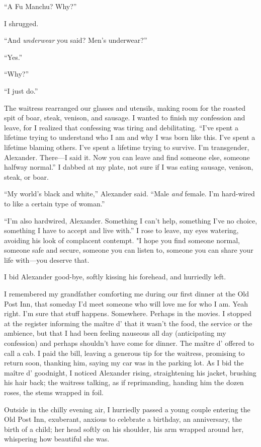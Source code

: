 ``A Fu Manchu? Why?''

I shrugged.

``And \emph{underwear} you said? Men's underwear?''

``Yes.''

``Why?''

``I just do.''

The waitress rearranged our glasses and utensils, making room for the
roasted spit of boar, steak, venison, and sausage. I wanted to finish my
confession and leave, for I realized that confessing was tiring and
debilitating. ``I've spent a lifetime trying to understand who I am and
why I was born like this. I've spent a lifetime blaming others. I've
spent a lifetime trying to survive. I'm transgender, Alexander.
There---I said it. Now you can leave and find someone else, someone
halfway normal.'' I dabbed at my plate, not sure if I was eating
sausage, venison, steak, or boar.

``My world's black and white,'' Alexander said. ``Male \emph{and}
female. I'm hard-wired to like a certain type of woman.''

``I'm also hardwired, Alexander. Something I can't help, something I've
no choice, something I have to accept and live with.'' I rose to leave,
my eyes watering, avoiding his look of complacent contempt. "I hope you
find someone normal, someone safe and secure, someone you can listen to,
someone you can share your life with---you deserve that.

I bid Alexander good-bye, softly kissing his forehead, and hurriedly
left.

I remembered my grandfather comforting me during our first dinner at the
Old Post Inn, that someday I'd meet someone who will love me for who I
am. Yeah right. I'm sure that stuff happens. Somewhere. Perhaps in the
movies. I stopped at the register informing the maître d' that it wasn't
the food, the service or the ambience, but that I had been feeling
nauseous all day (anticipating my confession) and perhaps shouldn't have
come for dinner. The maître d' offered to call a cab. I paid the bill,
leaving a generous tip for the waitress, promising to return soon,
thanking him, saying my car was in the parking lot. As I bid the maître
d' goodnight, I noticed Alexander rising, straightening his jacket,
brushing his hair back; the waitress talking, as if reprimanding,
handing him the dozen roses, the stems wrapped in foil.

Outside in the chilly evening air, I hurriedly passed a young couple
entering the Old Post Inn, exuberant, anxious to celebrate a birthday,
an anniversary, the birth of a child; her head softly on his shoulder,
his arm wrapped around her, whispering how beautiful she was.

